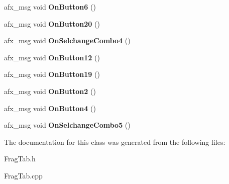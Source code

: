 \begin{DoxyCompactItemize}
\item 
\hypertarget{class_c_frag_tab_addd0ccd2b286363e1896bc27fb17e39a}{afx\-\_\-msg void {\bfseries On\-Button6} ()}\label{class_c_frag_tab_addd0ccd2b286363e1896bc27fb17e39a}

\item 
\hypertarget{class_c_frag_tab_a17bba7b68c18c8bc496dddfe980bc7ef}{afx\-\_\-msg void {\bfseries On\-Button20} ()}\label{class_c_frag_tab_a17bba7b68c18c8bc496dddfe980bc7ef}

\item 
\hypertarget{class_c_frag_tab_a0515ebce97969734a4f1d61fed05c89c}{afx\-\_\-msg void {\bfseries On\-Selchange\-Combo4} ()}\label{class_c_frag_tab_a0515ebce97969734a4f1d61fed05c89c}

\item 
\hypertarget{class_c_frag_tab_ae60edfd4203323ea831545924022e38f}{afx\-\_\-msg void {\bfseries On\-Button12} ()}\label{class_c_frag_tab_ae60edfd4203323ea831545924022e38f}

\item 
\hypertarget{class_c_frag_tab_a8c56002ff85b43d84d9846dfc2553658}{afx\-\_\-msg void {\bfseries On\-Button19} ()}\label{class_c_frag_tab_a8c56002ff85b43d84d9846dfc2553658}

\item 
\hypertarget{class_c_frag_tab_aa19dae0d404b2a212dc1af6937225eea}{afx\-\_\-msg void {\bfseries On\-Button2} ()}\label{class_c_frag_tab_aa19dae0d404b2a212dc1af6937225eea}

\item 
\hypertarget{class_c_frag_tab_acd59aa022c55e67b4117484a7c665744}{afx\-\_\-msg void {\bfseries On\-Button4} ()}\label{class_c_frag_tab_acd59aa022c55e67b4117484a7c665744}

\item 
\hypertarget{class_c_frag_tab_a096aed78521adf5f537481b2bb980c6e}{afx\-\_\-msg void {\bfseries On\-Selchange\-Combo5} ()}\label{class_c_frag_tab_a096aed78521adf5f537481b2bb980c6e}

\end{DoxyCompactItemize}


The documentation for this class was generated from the following files\-:\begin{DoxyCompactItemize}
\item 
Frag\-Tab.\-h\item 
Frag\-Tab.\-cpp\end{DoxyCompactItemize}
